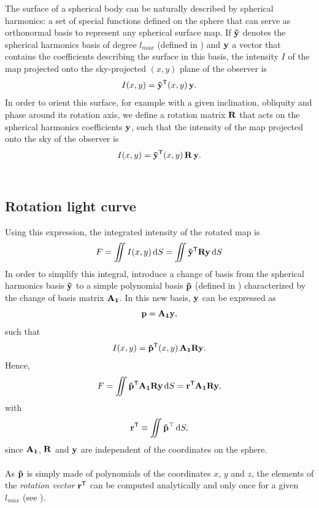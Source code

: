\documentclass[modern]{aastex631}
\begin{document}
The surface of a spherical body can be naturally described by spherical harmonics: a set of special functions defined on the sphere that can serve as orthonormal basis to represent any spherical surface map. If ${\mathbf{\tilde y}}$ denotes the spherical harmonics basis of degree $l_{max}$ (defined in \citealt[section 2.2]{starry}) and ${\mathbf{y}}$ a vector that contains the coefficients describing the surface in this basis, the intensity $I$ of the map projected onto the sky-projected $(x, y)$ plane of the observer is
\begin{equation}I(x, y) = \bvec{\tilde y^\mathsf{T}}(x, y) \, \bvec{y}.\end{equation}
In order to orient this surface, for example with a given inclination, obliquity and phase around its rotation axis, we define a rotation matrix ${\mathbf{R}}$ that acts on the spherical harmonics coefficients ${\mathbf{y}}$, such that the intensity of the map projected onto the sky of the observer is
\begin{equation}I(x, y) = \bvec{\tilde y}^\mathsf{T}(x, y) \, \bvec{R} \, \bvec{y}.\end{equation}\\
\subsection{Rotation light curve}
Using this expression, the integrated intensity of the rotated map is
\begin{equation}F = \iint I(x,y)\,\text{d}S = \iint \bvec{\tilde y^\mathsf{T}}\bvec{R}\bvec{y}\,\text{d}S\end{equation}
In order to simplify this integral, \citealt{starry} introduce a change of basis from the spherical harmonics basis ${\mathbf{\tilde y}}$ to a simple polynomial basis ${\mathbf{\tilde p}}$ (defined in \citealt[section 2.3]{starry}) characterized by the change of basis matrix ${\mathbf{A_1}}$. In this new basis, ${\mathbf{y}}$ can be expressed as
\begin{equation}\bvec{p} = \bvec{A_1}\bvec{y},\end{equation}
such that 
\begin{equation}I(x, y) = \bvec{\tilde p^\mathsf{T}}(x, y)\,\bvec{A_1}\bvec{R}\bvec{y}.\end{equation}
Hence,
\begin{equation}F = \iint \bvec{\tilde p^\mathsf{T}}\bvec{A_1}\bvec{R}\bvec{y}\,\text{d}S = \bvec{r^\mathsf{T}}\bvec{A_1}\bvec{R}\bvec{y},\end{equation}
with
\begin{equation}\bvec{r^\mathsf{T}} \equiv \iint \mathbf{\tilde{p}}^\top\,\text{d}S,\end{equation}
since ${\mathbf{A_1}}$, ${\mathbf{R}}$ and ${\mathbf{y}}$ are independent of the coordinates on the sphere.\\\\
As ${\mathbf{\tilde{p}}}$ is simply made of polynomials of the coordinates $x$, $y$ and $z$, the elements of the \textit{rotation vector} ${\mathbf{r}}^\mathsf{T}$ can be computed analytically and only once for a given $l_{max}$ (see \citealt[Eq. 20]{starry}).\\\\
\end{document}
